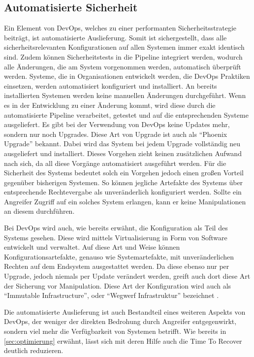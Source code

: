 \subsection{Automatisierte Sicherheit}
Ein Element von DevOps, welches zu einer performanten Sicherheitsstrategie beiträgt, ist automatisierte Auslieferung. 
Somit ist sichergestellt, dass alle sicherheitsrelevanten Konfigurationen auf allen Systemen immer exakt identisch sind. 
Zudem können Sicherheitstests in die Pipeline integriert werden, wodurch alle Änderungen, die am System vorgenommen werden, automatisch überprüft werden.
Systeme, die in Organisationen entwickelt werden, die DevOps Praktiken einsetzen, werden automatisiert konfiguriert und installiert. 
An bereits installierten Systemen werden keine manuellen Änderungen durchgeführt. 
Wenn es in der Entwicklung zu einer Änderung kommt, wird diese durch die automatisierte Pipeline verarbeitet, getestet und auf die entsprechenden Systeme ausgeliefert. 
Es gibt bei der Verwendung von DevOps keine Updates mehr, sondern nur noch Upgrades.
Diese Art von Upgrade ist auch als \enquote{Phoenix Upgrade} bekannt. 
Dabei wird das System bei jedem Upgrade vollständig neu ausgeliefert und installiert. 
Dieses Vorgehen zieht keinen zusätzlichen Aufwand nach sich, da all diese Vorgänge automatisiert ausgeführt werden.
Für die Sicherheit des Systems bedeutet solch ein Vorgehen jedoch einen großen Vorteil gegenüber bisherigen Systemen. 
So können jegliche Artefakte des Systems über entsprechende Rechtevergabe als unveränderlich konfiguriert werden. 
Sollte ein Angreifer Zugriff auf ein solches System erlangen, kann er keine Manipulationen an diesem durchführen. \parencite[Vgl.][S. 22]{fisher-miranda:2014}

Bei DevOps wird auch, wie bereits erwähnt, die Konfiguration als Teil des Systems gesehen. 
Diese wird mittels Virtualisierung in Form von Software entwickelt und verwaltet. 
Auf diese Art und Weise können Konfigurationsartefakte, genauso wie Systemartefakte, mit unveränderlichen Rechten auf dem Endsystem ausgestattet werden. 
Da diese ebenso nur per Upgrade, jedoch niemals per Update verändert werden, greift auch dort diese Art der Sicherung vor Manipulation. 
Diese Art der Konfiguration wird auch als \enquote{Immutable Infrastructure}, oder \enquote{Wegwerf Infrastruktur} bezeichnet \parencite[vgl.][S. 16]{matthias:2015}.

Die automatisierte Auslieferung ist auch Bestandteil eines weiteren Aspekts von DevOps, der weniger der direkten Bedrohung durch Angreifer entgegenwirkt, sondern viel mehr die Verfügbarkeit von Systemen betrifft. 
Wie bereits in \autoref{sec:optimierung} erwähnt, lässt sich mit deren Hilfe auch die Time To Recover deutlich reduzieren. 

